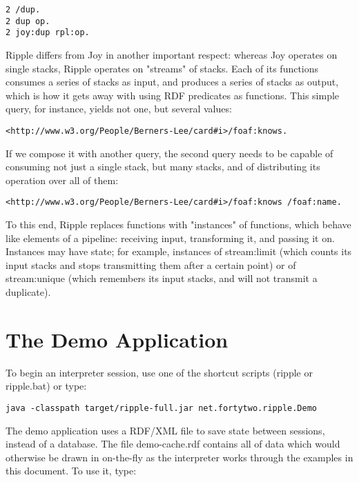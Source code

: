 \documentclass[runningheads]{llncs}
\begin{document}
\begin{verbatim}
2 /dup.
2 dup op.
2 joy:dup rpl:op.
\end{verbatim}

Ripple differs from Joy in another important respect: whereas Joy operates on single stacks, Ripple operates on "streams" of stacks.  Each of its functions consumes a series of stacks as input, and produces a series of stacks as output, which is how it gets away with using RDF predicates as functions.  This simple query, for instance, yields not one, but several values:

\begin{verbatim}
<http://www.w3.org/People/Berners-Lee/card#i>/foaf:knows.
\end{verbatim}

If we compose it with another query, the second query needs to be capable of consuming not just a single stack, but many stacks, and of distributing its operation over all of them:

\begin{verbatim}
<http://www.w3.org/People/Berners-Lee/card#i>/foaf:knows /foaf:name.
\end{verbatim}

To this end, Ripple replaces functions with "instances" of functions, which behave like elements of a pipeline: receiving input, transforming it, and passing it on.  Instances may have state; for example, instances of stream:limit (which counts its input stacks and stops transmitting them after a certain point) or of stream:unique (which remembers its input stacks, and will not transmit a duplicate).

\section{The Demo Application}

To begin an interpreter session, use one of the shortcut scripts (ripple or ripple.bat) or type:

\begin{verbatim}
java -classpath target/ripple-full.jar net.fortytwo.ripple.Demo
\end{verbatim}

The demo application uses a RDF/XML file to save state between sessions, instead of a database.  The file demo-cache.rdf contains all of data which would otherwise be drawn in on-the-fly as the interpreter works through the examples in this document.  To use it, type:
\end{document}
